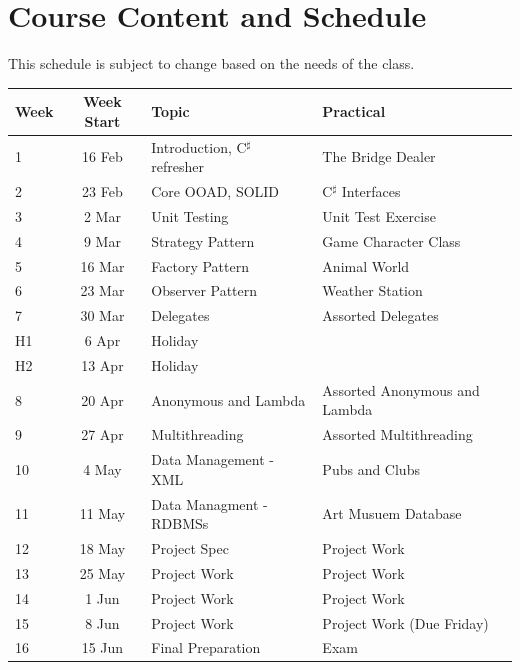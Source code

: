 \documentclass{article}
\newcommand{\Csh}{C$^\sharp$}
\begin{document}

\section*{Course Content and Schedule}
This schedule is subject to change based on the needs of the class.

\renewcommand{\arraystretch}{1.5}
\begin{tabular}{|l|c|l|l|}
\hline
 Week & Week Start & Topic                   & Practical      \\ \hline
1    & 16 Feb     & Introduction, \Csh{} refresher & The Bridge Dealer\\ \hline
2    & 23 Feb     & Core OOAD, SOLID & \Csh{} Interfaces \\ \hline
 3    &  2 Mar     & Unit Testing  & Unit Test Exercise \\ \hline
 4    &  9 Mar     & Strategy Pattern & Game Character Class   \\ \hline
 5    & 16 Mar     & Factory Pattern & Animal World  \\ \hline
 6    & 23 Mar     & Observer Pattern & Weather Station    \\ \hline
 7    & 30 Mar     & Delegates  & Assorted Delegates \\ \hline
 H1   &  6 Apr     & Holiday            & \\ \hline
 H2   & 13 Apr     & Holiday            & \\ \hline
 8    & 20 Apr     & Anonymous and Lambda  & Assorted Anonymous and Lambda \\ \hline
 9    & 27 Apr     & Multithreading  & Assorted Multithreading         \\ \hline
 10   &  4 May     & Data Management - XML & Pubs and Clubs \\ \hline
 11   & 11 May     & Data Managment - RDBMSs &  Art Musuem Database \\ \hline
 12   & 18 May     & Project Spec &  Project Work \\ \hline
 13   & 25 May     & Project Work & Project Work  \\ \hline
 14   &  1 Jun     & Project Work & Project Work  \\ \hline
15   &  8 Jun     & Project Work & Project Work (Due Friday)  \\ \hline
 16   & 15 Jun     & Final Preparation & Exam \\ \hline
\end{tabular}
\end{document}
